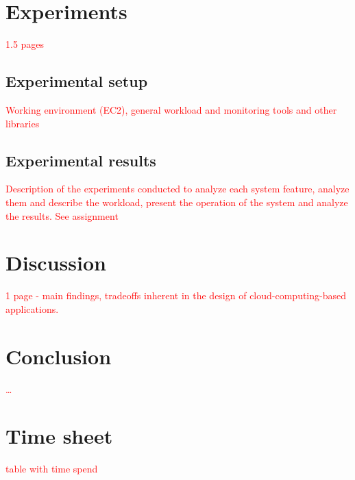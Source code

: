 \documentclass{stylesheet}
\begin{document}
\section{Experiments}
\label{sec:experiments}
\textcolor{red}{1.5 pages}
\subsection{Experimental setup}
\label{subsec:setup}
\textcolor{red}{Working environment (EC2), general workload and monitoring tools and other libraries}

\subsection{Experimental results}
\label{subsec:results}
\textcolor{red}{Description of the experiments conducted to analyze each system feature, analyze them and describe the workload, present the operation of the system and analyze the results. See assignment}

\section{Discussion}
\label{sec:discussion}
\textcolor{red}{1 page - main findings, tradeoffs inherent in the design of cloud-computing-based applications.}

\section{Conclusion}
\label{sec:conclusion}
\textcolor{red}{\ldots}




\appendix
\section{Time sheet}
\label{app:time}
\textcolor{red}{table with time spend}
\end{document}
